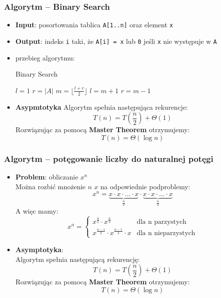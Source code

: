 \documentclass[11pt,a4paper]{article}
\begin{document}
\subsubsection{Algorytm -- Binary Search}
\begin{itemize}
    \item \textbf{Input}: posortowania tablica \texttt{A[1..n]} oraz element \texttt{x}
    \item \textbf{Output}: indeks \texttt{i} taki, że \texttt{A[i] = x} lub \texttt{0} jeśli \texttt{x} nie występuje w \texttt{A}
    \item przebieg algorytmu: %
        \begin{algorithm}[H]
            \caption{Binary Search}
            \begin{algorithmic}[1]
                \State $l = 1$
                \State $r = |A|$
                \State $m = \lfloor \frac{l+r}{2} \rfloor$
                \State {}
                \State $l = m + 1$
                \Else
                \State $r = m - 1$
                \EndIf
                \EndWhile
                \State {}
                \EndProcedure
            \end{algorithmic}
        \end{algorithm}
    \item \textbf{Asypmtotyka}
        Algorytm spełnia następująca rekurencje:
        \[
            T(n) = T(\frac{n}{2}) + \Theta(1)
        \]
        Rozwiązując za pomocą \textbf{Master Theorem} otrzymujemy:
        \[
            T(n) = \Theta(\log n)
        \]
\end{itemize}

\subsubsection{Algorytm -- potęgowanie liczby do naturalnej potęgi}
\begin{itemize}
    \item \textbf{Problem}: obliczanie $x^n$\\
        Można rozbić mnożenie $n$ $x$ na odpowiednie podproblemy:
        \[
            x^n = \underbrace{x \cdot x \cdot \dots \cdot x}_{\frac{n}{2}} \cdot \underbrace{x \cdot x \cdot \dots \cdot x}_{\frac{n}{2}}
        \]
        A więc mamy:
        \[
            x^n = \begin{cases}
                x^{\frac{n}{2}} \cdot x^{\frac{n}{2}} & \text{dla n parzystych} \\
                x^{\frac{n-1}{2}} \cdot x^{\frac{n-1}{2}} \cdot x & \text{dla n nieparzystych}
            \end{cases}
        \]
    \item \textbf{Asymptotyka}: \\
        Algorytm spełnia następującą rekurencję:
        \[
            T(n) = T(\frac{n}{2}) + \Theta(1)
        \]
        Rozwiązując za pomocą \textbf{Master Theorem} otrzymujemy:
        \[
            T(n) = \Theta(\log n)
        \]
\end{itemize}
\end{document}
